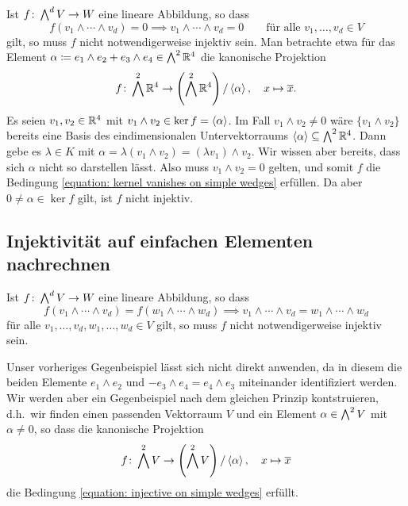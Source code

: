 Ist $f \colon \bigwedge^{d} V \to W$ eine lineare Abbildung, so dass
\begin{equation}
  \label{equation: kernel vanishes on simple wedges}
            f(v_1 \wedge \dotsb \wedge v_d) = 0
  \implies  v_1 \wedge \dotsb \wedge v_d = 0
  \qquad
  \text{für alle $v_1, \dotsc, v_d \in V$}
\end{equation}
gilt, so muss $f$ nicht notwendigerweise injektiv sein.
Man betrachte etwa für das Element $\alpha \coloneqq e_1 \wedge e_2 + e_3 \wedge e_4 \in \bigwedge^{2} \mathbb{R}^4$ die kanonische Projektion
\[
          f
  \colon  \bigwedge^{2} \mathbb{R}^4
  \to     \left( \bigwedge^{2} \mathbb{R}^4 \right) / \left\langle \alpha \right\rangle,
  \quad   x
  \mapsto \overline{x}.
\]
Es seien $v_1, v_2 \in \mathbb{R}^4$ mit $v_1 \wedge v_2 \in \ker f = \left\langle \alpha \right\rangle$.
Im Fall $v_1 \wedge v_2 \neq 0$ wäre $\{ v_1 \wedge v_2 \}$ bereits eine Basis des eindimensionalen Untervektorraums $\left\langle \alpha \right\rangle \subseteq \bigwedge^{2} \mathbb{R}^4$.
Dann gebe es $\lambda \in K$ mit $\alpha = \lambda (v_1 \wedge v_2) = (\lambda v_1) \wedge v_2$.
Wir wissen aber bereits, dass sich $\alpha$ nicht so darstellen lässt.
Also muss $v_1 \wedge v_2 = 0$ gelten, und somit $f$ die Bedingung \eqref{equation: kernel vanishes on simple wedges} erfüllen.
Da aber $0 \neq \alpha \in \ker f$ gilt, ist $f$ nicht injektiv.





\subsection{Injektivität auf einfachen Elementen nachrechnen}

Ist $f \colon \bigwedge^{d} V \to W$ eine lineare Abbildung, so dass
\begin{equation}
  \label{equation: injective on simple wedges}
            f(v_1 \wedge \dotsb \wedge v_d) = f(w_1 \wedge \dotsb \wedge w_d)
  \implies  v_1 \wedge \dotsb \wedge v_d = w_1 \wedge \dotsb \wedge w_d
\end{equation}
für alle $v_1, \dotsc, v_d, w_1, \dotsc, w_d \in V$ gilt, so muss $f$ nicht notwendigerweise injektiv sein.

Unser vorheriges Gegenbeispiel lässt sich nicht direkt anwenden, da in diesem die beiden Elemente $e_1 \wedge e_2$ und $- e_3 \wedge e_4 = e_4 \wedge e_3$ miteinander identifiziert werden.
Wir werden aber ein Gegenbeispiel nach dem gleichen Prinzip kontstruieren, d.h.\ wir finden einen passenden Vektorraum $V$ und ein Element $\alpha \in \bigwedge^{2} V$ mit $\alpha \neq 0$, so dass die kanonische Projektion
\[
          f
  \colon  \bigwedge^{2} V
  \to     \left( \bigwedge^{2} V \right) / \left\langle \alpha \right\rangle,
  \quad   x
  \mapsto \overline{x}
\]
die Bedingung \eqref{equation: injective on simple wedges} erfüllt.

